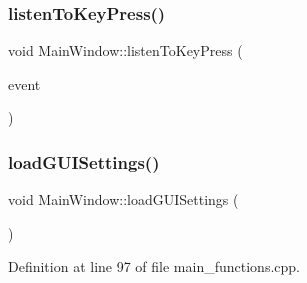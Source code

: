 \subsubsection{\texorpdfstring{listenToKeyPress()}{listenToKeyPress()}}
{\footnotesize\ttfamily void Main\+Window\+::listen\+To\+Key\+Press (\begin{DoxyParamCaption}\item[{Q\+Key\+Event $\ast$}]{event }\end{DoxyParamCaption})\hspace{0.3cm}{\ttfamily [private]}}

\mbox{\label{classMainWindow_ad0f8d1384a86ac65b996addd300ef620}} 
\subsubsection{\texorpdfstring{loadGUISettings()}{loadGUISettings()}}
{\footnotesize\ttfamily void Main\+Window\+::load\+G\+U\+I\+Settings (\begin{DoxyParamCaption}{ }\end{DoxyParamCaption})\hspace{0.3cm}{\ttfamily [private]}}



Definition at line 97 of file main\+\_\+functions.\+cpp.

